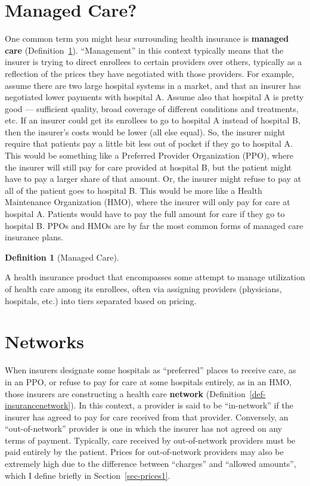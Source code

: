 \documentclass[
  letterpaper,
  DIV=11,
  numbers=noendperiod]{scrreport}
\theoremstyle{definition}
\newtheorem{definition}{Definition}[chapter]
\theoremstyle{remark}
\begin{document}
\hypertarget{managed-care}{%
\section{Managed Care?}\label{managed-care}}

One common term you might hear surrounding health insurance is
\textbf{managed care} (Definition~\ref{def-managedcare}). ``Management''
in this context typically means that the insurer is trying to direct
enrollees to certain providers over others, typically as a reflection of
the prices they have negotiated with those providers. For example,
assume there are two large hospital systems in a market, and that an
insurer has negotiated lower payments with hospital A. Assume also that
hospital A is pretty good --- sufficient quality, broad coverage of
different conditions and treatments, etc. If an insurer could get its
enrollees to go to hospital A instead of hospital B, then the insurer's
costs would be lower (all else equal). So, the insurer might require
that patients pay a little bit less out of pocket if they go to hospital
A. This would be something like a Preferred Provider Organization (PPO),
where the insurer will still pay for care provided at hospital B, but
the patient might have to pay a larger share of that amount. Or, the
insurer might refuse to pay at all of the patient goes to hospital B.
This would be more like a Health Maintenance Organization (HMO), where
the insurer will only pay for care at hospital A. Patients would have to
pay the full amount for care if they go to hospital B. PPOs and HMOs are
by far the most common forms of managed care insurance plans.

\begin{definition}[Managed
Care]\protect\hypertarget{def-managedcare}{}\label{def-managedcare}

A health insurance product that encompasses some attempt to manage
utilization of health care among its enrollees, often via assigning
providers (physicians, hospitals, etc.) into tiers separated based on
pricing.

\end{definition}

\hypertarget{networks}{%
\section{Networks}\label{networks}}

When insurers designate some hospitals as ``preferred'' places to
receive care, as in an PPO, or refuse to pay for care at some hospitals
entirely, as in an HMO, those insurers are constructing a health care
\textbf{network} (Definition~\ref{def-insurancenetwork}). In this
context, a provider is said to be ``in-network'' if the insurer has
agreed to pay for care received from that provider. Conversely, an
``out-of-network'' provider is one in which the insurer has not agreed
on any terms of payment. Typically, care received by out-of-network
providers must be paid entirely by the patient. Prices for
out-of-network providers may also be extremely high due to the
difference between ``charges'' and ``allowed amounts'', which I define
briefly in Section~\ref{sec-prices1}.
\end{document}
